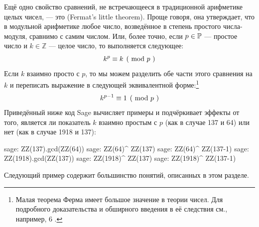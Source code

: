 Ещё одно свойство сравнений, не встречающееся в традиционной арифметике целых чисел, — это  (Fermat's little theorem). Проще говоря, она утверждает, что в модульной арифметике любое число, возведённое в степень простого числа-модуля, сравнимо с самим числом. Или, более точно, если $ p \in \mathbb{P} $ — простое число и $ k \in \mathbb{Z} $ — целое число, то выполняется следующее:
\begin{equation}\label{fermats-little-theorem}
\kongru{k ^ p}{k}{p} 
\end{equation}
Если $k$ взаимно просто с $p$, то мы можем разделить обе части этого сравнения на $k$ и переписать выражение в следующей эквивалентной форме:\footnote{Малая теорема Ферма имеет большое значение в теории чисел. Для подробного доказательства и обширного введения в её следствия см., например, \chaptname{} 6 \cite{hardy-2008}.}
\begin{equation}
\label{eq_fermat_lt_2}
\kongru{k ^{p-1}}{1}{p}
\end{equation}
Приведённый ниже код Sage вычисляет примеры  и подчёркивает эффекты от того, является ли показатель $k$ взаимно простым с $p$ (как в случае 137 и 64) или нет (как в случае 1918 и 137):
\begin{sagecommandline}
sage: ZZ(137).gcd(ZZ(64))
sage: ZZ(64)^ ZZ(137) %
sage: ZZ(64)^ ZZ(137-1) %
sage: ZZ(1918).gcd(ZZ(137))
sage: ZZ(1918)^ ZZ(137) %
sage: ZZ(1918)^ ZZ(137-1) %
\end{sagecommandline}

Следующий пример содержит большинство понятий, описанных в этом разделе.

